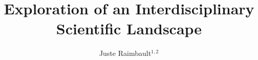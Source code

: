 %
%
%
%
%
%
\RequirePackage{fix-cm}
%
\documentclass[smallextended]{svjour3}       %
%
\smartqed  %
%
\usepackage{graphicx}
%
%
%
%
%




\usepackage{natbib}











\title{Exploration of an Interdisciplinary Scientific Landscape}


\author{Juste Raimbault$^{1,2}$}

